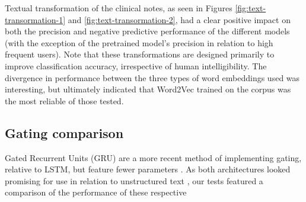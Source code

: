 \begin{table}[ht]

\setlength{\tabcolsep}{9pt}
      \centering
\caption{Performance relating to word embedding method: t(50).}
\label{table:embedding-comp-50}
\end{table}

Textual transformation of the clinical notes, as seen in Figures \ref{fig:text-transormation-1} and \ref{fig:text-transormation-2}, had a clear positive impact on both  the precision and negative predictive performance of the different models (with the exception of the pretrained model's precision in relation to high frequent users). Note that these transformations are designed primarily to improve classification accuracy, irrespective of human intelligibility. The divergence in performance between the three types of word embeddings used was interesting, but ultimately indicated that Word2Vec trained on the corpus was the most reliable of those tested.






\subsection{Gating comparison}

Gated Recurrent Units (GRU) are a more recent method of implementing gating, relative to LSTM, but feature fewer parameters \cite{cho2014learning}. As both architectures looked promising for use in relation to unstructured text \cite{bansal2016ask}, our tests featured a comparison of the performance of these respective  









